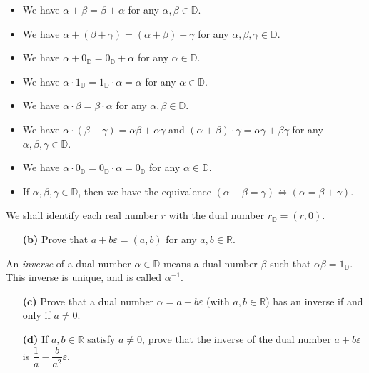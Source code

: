 \documentclass[paper=a4, fontsize=12pt]{scrartcl}%
\theoremstyle{plainsl}
\theoremstyle{definition}
\theoremstyle{remark}
\begin{document}
\begin{itemize}
\item We have $\alpha+ \beta= \beta+ \alpha$ for any $\alpha, \beta
\in{\mathbb{D}}$.

\item We have $\alpha+ \left(  \beta+ \gamma\right)  = \left(  \alpha+
\beta\right)  + \gamma$ for any $\alpha, \beta, \gamma\in{\mathbb{D}}$.

\item We have $\alpha+0_{\mathbb{D}}=0_{\mathbb{D}}+\alpha$ for any $\alpha
\in{\mathbb{D}}$.

\item We have $\alpha\cdot1_{\mathbb{D}}=1_{\mathbb{D}}\cdot\alpha=\alpha$ for
any $\alpha\in{\mathbb{D}}$.

\item We have $\alpha\cdot\beta=\beta\cdot\alpha$ for any $\alpha,\beta
\in{\mathbb{D}}$.

\item We have $\alpha\cdot\left(  \beta+\gamma\right)  =\alpha\beta
+\alpha\gamma$ and $\left(  \alpha+\beta\right)  \cdot\gamma=\alpha
\gamma+\beta\gamma$ for any $\alpha,\beta,\gamma\in{\mathbb{D}}$.

\item We have $\alpha\cdot0_{\mathbb{D}}=0_{\mathbb{D}}\cdot\alpha
=0_{\mathbb{D}}$ for any $\alpha\in{\mathbb{D}}$.

\item If $\alpha,\beta,\gamma\in{\mathbb{D}}$, then we have the equivalence
$\left(  \alpha-\beta=\gamma\right)  \iff\left(  \alpha=\beta+\gamma\right)  $.
\end{itemize}

We shall identify each real number $r$ with the dual number $r_{\mathbb{D}} =
\left(  r, 0 \right)  $.

\begin{enumerate}
\item[\textbf{(b)}] Prove that $a + b\varepsilon= \left(  a, b \right)  $ for
any $a, b \in\mathbb{R}$.
\end{enumerate}

An \textit{inverse} of a dual number $\alpha\in{\mathbb{D}}$ means a dual
number $\beta$ such that $\alpha\beta= 1_{\mathbb{D}}$. This inverse is
unique, and is called $\alpha^{-1}$.

\begin{enumerate}
\item[\textbf{(c)}] Prove that a dual number $\alpha= a + b\varepsilon$ (with
$a, b \in\mathbb{R}$) has an inverse if and only if $a \neq0$.

\item[\textbf{(d)}] If $a, b \in\mathbb{R}$ satisfy $a \neq0$, prove that the
inverse of the dual number $a + b\varepsilon$ is $\dfrac{1}{a} - \dfrac
{b}{a^{2}} \varepsilon$.
\end{enumerate}
\end{document}
